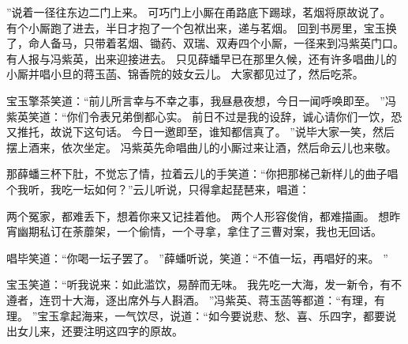 ”说着一径往东边二门上来。
可巧门上小厮在甬路底下踢球，茗烟将原故说了。
有个小厮跑了进去，半日才抱了一个包袱出来，递与茗烟。
回到书房里，宝玉换了，命人备马，只带着茗烟、锄药、双瑞、双寿四个小厮，一径来到冯紫英门口。
有人报与冯紫英，出来迎接进去。
只见薛蟠早已在那里久候，还有许多唱曲儿的小厮并唱小旦的蒋玉菡、锦香院的妓女云儿。
大家都见过了，然后吃茶。
\par
宝玉擎茶笑道：“前儿所言幸与不幸之事，我昼悬夜想，今日一闻呼唤即至。
”冯紫英笑道：“你们令表兄弟倒都心实。
前日不过是我的设辞，诚心请你们一饮，恐又推托，故说下这句话。
今日一邀即至，谁知都信真了。
”说毕大家一笑，然后摆上酒来，依次坐定。
冯紫英先命唱曲儿的小厮过来让酒，然后命云儿也来敬。
\par
那薛蟠三杯下肚，不觉忘了情，拉着云儿的手笑道：“你把那梯己新样儿的曲子唱个我听，我吃一坛如何？”云儿听说，只得拿起琵琶来，唱道：\par
\hop
两个冤家，都难丢下，想着你来又记挂着他。
两个人形容俊俏，都难描画。
想昨宵幽期私订在荼蘼架，一个偷情，一个寻拿，拿住了三曹对案，我也无回话。
\par
\hop
唱毕笑道：“你喝一坛子罢了。
”薛蟠听说，笑道：“不值一坛，再唱好的来。
”\par
宝玉笑道：“听我说来：如此滥饮，易醉而无味。
我先吃一大海，发一新令，有不遵者，连罚十大海，逐出席外与人斟酒。
”冯紫英、蒋玉菡等都道：“有理，有理。
”宝玉拿起海来，一气饮尽，说道：“如今要说悲、愁、喜、乐四字，都要说出女儿来，还要注明这四字的原故。
